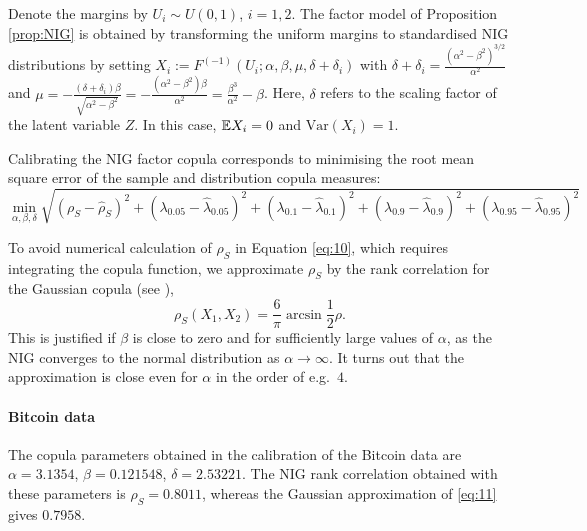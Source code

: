 Denote the margins by
$U_i\sim U(0,1)$, $i=1,2$. The factor model of Proposition
\ref{prop:NIG} is 
obtained by transforming the uniform margins to standardised NIG
distributions by setting  
$X_i:=F^{(-1)}(U_i; \alpha, \beta, \mu, \delta+\delta_i)$ with 
$\delta+\delta_i=\displaystyle \frac{(\alpha^2-\beta^2)^{3/2}}
{\alpha^2}$ and $\mu=\displaystyle -\frac{(\delta+\delta_i)\beta}
{\sqrt{\alpha^2-\beta^2}} = -\frac{(\alpha^2-\beta^2) \beta}
{\alpha^2}=\frac{\beta^3}{\alpha^2}-\beta$. Here, $\delta$ refers to
the scaling factor of the latent variable $Z$. In 
this case, ${\mathbb{E}} X_i=0$ and $\text{Var}(X_i)=1$.

Calibrating the NIG factor copula corresponds to minimising the
root mean square error of the sample and distribution copula measures: 
\begin{equation*}
  \min_{\alpha, \beta, \delta} \sqrt{ (\rho_S - \hat\rho_S)^2 +
    (\lambda_{0.05}-\hat\lambda_{0.05})^2 + 
    (\lambda_{0.1}-\hat\lambda_{0.1})^2 + 
    (\lambda_{0.9}-\hat\lambda_{0.9})^2 + 
    (\lambda_{0.95}-\hat\lambda_{0.95})^2}
\end{equation*}

To avoid numerical calculation of $\rho_S$ in Equation
\eqref{eq:10}, which requires integrating the copula
function, we approximate $\rho_S$ by the rank correlation for the
Gaussian copula (see \citep[p.\ 215]{McNeil2005}), 
\begin{equation}
  \label{eq:11}
  \rho_S(X_1,X_2) = \frac{6}{\pi} \arcsin \frac{1}{2}\rho. 
\end{equation}
This is justified if $\beta$ is close to zero and for sufficiently
large values of $\alpha$, as the NIG converges to the normal
distribution as $\alpha\rightarrow\infty$. It turns out that the
approximation is close even for $\alpha$ in the order of e.g.\ $4$.


\paragraph{Bitcoin data}

The copula parameters obtained in the calibration of the Bitcoin data
are $\alpha=3.1354$, $\beta=0.121548$, $\delta=2.53221$. The NIG rank
correlation obtained with these parameters is $\rho_S=0.8011$, whereas
the Gaussian approximation of \eqref{eq:11} gives $0.7958$.

